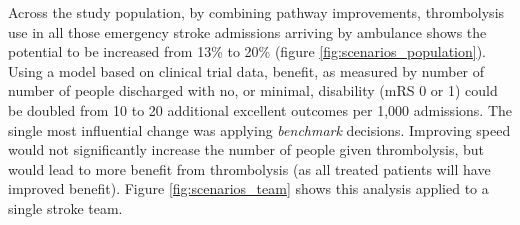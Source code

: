 Across the study population, by combining pathway improvements, thrombolysis use in all those emergency stroke admissions arriving by ambulance shows the potential to be increased from 13\% to 20\% (figure \ref{fig:scenarios_population}). Using a model based on clinical trial data, benefit, as measured by number of number of people discharged with no, or minimal, disability (mRS 0 or 1)  could be doubled from 10 to 20 additional excellent outcomes per 1,000 admissions. The single most influential change was applying \textit{benchmark} decisions. Improving speed would not significantly increase the number of people given thrombolysis, but would lead to more benefit from thrombolysis (as all treated patients will have improved benefit). Figure \ref{fig:scenarios_team} shows this analysis applied to a single stroke team.



